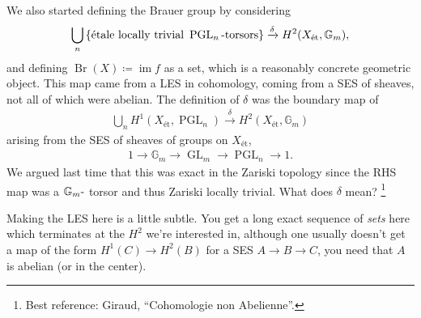 We also started defining the Brauer group by considering
\begin{align*}  
\bigcup_n \left\{{\text{étale locally trivial } \operatorname{PGL}_n{\hbox{-}}\text{torsors}}\right\}
\xrightarrow{\delta}
H^2(X_\text{ét}, {\mathbb{G}}_m)
,\end{align*}
and defining \(\operatorname{Br}(X) \coloneqq\operatorname{im}f\) as a
set, which is a reasonably concrete geometric object. This map came from
a LES in cohomology, coming from a SES of sheaves, not all of which were
abelian. The definition of \(\delta\) was the boundary map of
\begin{align*}  
\bigcup_n H^1(X_\text{ét}, \operatorname{PGL}_n)
\xrightarrow{\delta}
H^2(X_\text{ét}, {\mathbb{G}}_m)
\label{eq:12_union_1}
\end{align*}
arising from the SES of sheaves of groups on \(X_\text{ét}\),
\begin{align*}  
1 
\to {\mathbb{G}}_m 
\xrightarrow{} 
\operatorname{GL}_m
\xrightarrow{}
\operatorname{PGL}_n \to 1
.\end{align*}
We argued last time that this was exact in the Zariski topology since
the RHS map was a \({\mathbb{G}}_m{\hbox{-}}\) torsor and thus Zariski
locally trivial. What does \(\delta\) mean? \footnote{Best reference:
  Giraud, ``Cohomologie non Abelienne''.}

\begin{remark}

Making the LES here is a little subtle. You get a long exact sequence of
\emph{sets} here which terminates at the \(H^2\) we're interested in,
although one usually doesn't get a map of the form \(H^1(C) \to H^2(B)\)
for a SES \(A \xrightarrow{}B \xrightarrow{}C\), you need that \(A\) is
abelian (or in the center).

\end{remark}

